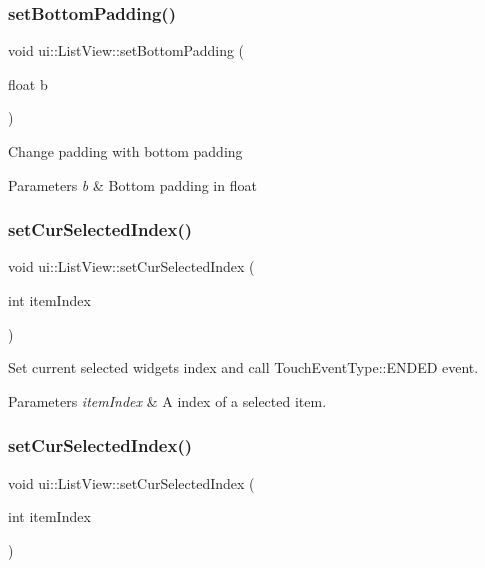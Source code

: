 \subsubsection{\texorpdfstring{set\+Bottom\+Padding()}{setBottomPadding()}}
{\footnotesize\ttfamily void ui\+::\+List\+View\+::set\+Bottom\+Padding (\begin{DoxyParamCaption}\item[{float}]{b }\end{DoxyParamCaption})}

Change padding with bottom padding 
\begin{DoxyParams}{Parameters}
{\em b} & Bottom padding in float \\
\hline
\end{DoxyParams}
\mbox{\label{classui_1_1ListView_a087e340d27a4f774c63b5b8dadd4206a}} 
\subsubsection{\texorpdfstring{set\+Cur\+Selected\+Index()}{setCurSelectedIndex()}\hspace{0.1cm}{\footnotesize\ttfamily [1/2]}}
{\footnotesize\ttfamily void ui\+::\+List\+View\+::set\+Cur\+Selected\+Index (\begin{DoxyParamCaption}\item[{int}]{item\+Index }\end{DoxyParamCaption})}



Set current selected widget\textquotesingle{}s index and call Touch\+Event\+Type\+::\+E\+N\+D\+ED event. 


\begin{DoxyParams}{Parameters}
{\em item\+Index} & A index of a selected item. \\
\hline
\end{DoxyParams}
\mbox{\label{classui_1_1ListView_a087e340d27a4f774c63b5b8dadd4206a}} 
\subsubsection{\texorpdfstring{set\+Cur\+Selected\+Index()}{setCurSelectedIndex()}\hspace{0.1cm}{\footnotesize\ttfamily [2/2]}}
{\footnotesize\ttfamily void ui\+::\+List\+View\+::set\+Cur\+Selected\+Index (\begin{DoxyParamCaption}\item[{int}]{item\+Index }\end{DoxyParamCaption})}



